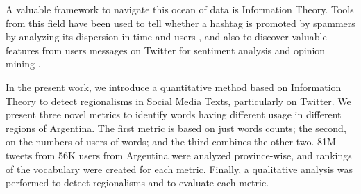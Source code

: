 A valuable framework to navigate this ocean of data is Information Theory. Tools from this field have been used to tell whether a hashtag is promoted by spammers by analyzing its dispersion in time and users \cite{Cui:2012:DBE:2396761.2398519, ghosh2011entropy}, and also to discover valuable features from users messages on Twitter for sentiment analysis and opinion mining \cite{pak2010twitter}.

In the present work, we introduce a quantitative method based on Information Theory to detect regionalisms in Social Media Texts, particularly on Twitter. We present three novel metrics to identify words having different usage in different regions of Argentina. The first metric is based on just words counts; the second, on the numbers of users of words; and the third combines the other two. 81M tweets from  56K users from Argentina were analyzed province-wise, and rankings of the vocabulary were created for each metric. Finally, a qualitative analysis was performed to detect regionalisms and to evaluate each metric.